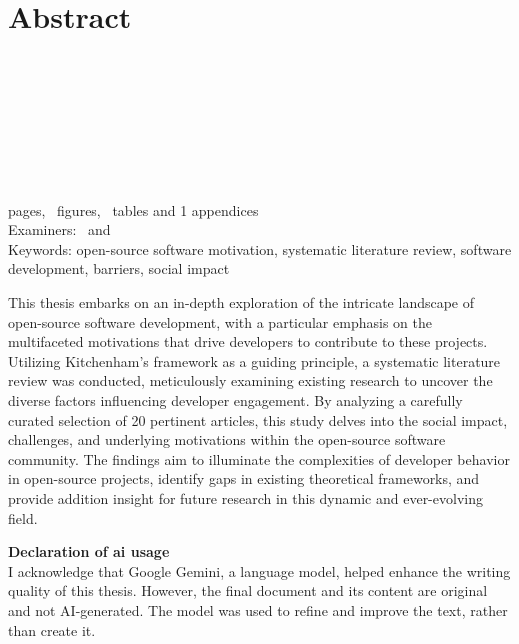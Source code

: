 \section*{Abstract}
\begin{spacing}{1.5}
    \university\\
    \school\\
    \degreeprogramme\\
\end{spacing}

\myname

\textbf{\mytitle}\\
\mysubtitle

\begin{spacing}{1.5}
    \thesistype\\
    \thesisyear\\
    \pageref{myLastPage} pages, \totalfigures~figures, \totaltables~tables and 1 appendices\\
    Examiners: \examinerA~and \examinerB\\
    Keywords: open-source software motivation, systematic literature review, software development, barriers, social impact
\end{spacing}

\vspace{1em}
\begin{spacing}{1.0}

    This thesis embarks on an in-depth exploration of the intricate landscape of open-source software development, with a particular emphasis on the multifaceted motivations that drive developers to contribute to these projects. Utilizing Kitchenham's framework as a guiding principle, a systematic literature review was conducted, meticulously examining existing research to uncover the diverse factors influencing developer engagement. By analyzing a carefully curated selection of 20 pertinent articles, this study delves into the social impact, challenges, and underlying motivations within the open-source software community. The findings aim to illuminate the complexities of developer behavior in open-source projects, identify gaps in existing theoretical frameworks, and provide addition insight for future research in this dynamic and ever-evolving field.

\end{spacing}

\textbf{Declaration of \ac{ai} usage} \\
I acknowledge that Google Gemini, a language model, helped enhance the writing quality of this thesis. However, the final document and its content are original and not AI-generated. The model was used to refine and improve the text, rather than create it.
\clearpage %
